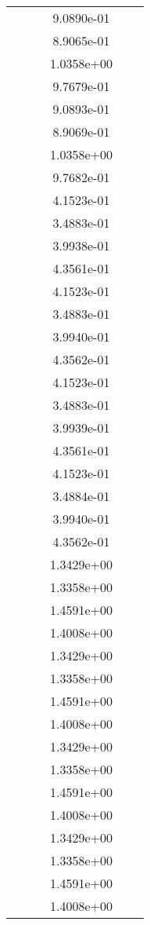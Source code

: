 \begin{xltabular}{\textwidth}{r|rS[table-format=1.3e+2]S[table-format=1.4e+2]S[table-format=1.4e+2]S[table-format=-1.5]}
&  &  & 9.0890e-01 & & \\
&  &  & 8.9065e-01 & & \\
&  &  & 1.0358e+00 & & \\
&  &  & 9.7679e-01 & & \\
&  &  & 9.0893e-01 & & \\
&  &  & 8.9069e-01 & & \\
&  &  & 1.0358e+00 & & \\
&  &  & 9.7682e-01 & & \\
&  &  & 4.1523e-01 & & \\
&  &  & 3.4883e-01 & & \\
&  &  & 3.9938e-01 & & \\
&  &  & 4.3561e-01 & & \\
&  &  & 4.1523e-01 & & \\
&  &  & 3.4883e-01 & & \\
&  &  & 3.9940e-01 & & \\
&  &  & 4.3562e-01 & & \\
&  &  & 4.1523e-01 & & \\
&  &  & 3.4883e-01 & & \\
&  &  & 3.9939e-01 & & \\
&  &  & 4.3561e-01 & & \\
&  &  & 4.1523e-01 & & \\
&  &  & 3.4884e-01 & & \\
&  &  & 3.9940e-01 & & \\
&  &  & 4.3562e-01 & & \\
&  &  & 1.3429e+00 & & \\
&  &  & 1.3358e+00 & & \\
&  &  & 1.4591e+00 & & \\
&  &  & 1.4008e+00 & & \\
&  &  & 1.3429e+00 & & \\
&  &  & 1.3358e+00 & & \\
&  &  & 1.4591e+00 & & \\
&  &  & 1.4008e+00 & & \\
&  &  & 1.3429e+00 & & \\
&  &  & 1.3358e+00 & & \\
&  &  & 1.4591e+00 & & \\
&  &  & 1.4008e+00 & & \\
&  &  & 1.3429e+00 & & \\
&  &  & 1.3358e+00 & & \\
&  &  & 1.4591e+00 & & \\
&  &  & 1.4008e+00 & & \\

\end{xltabular}
